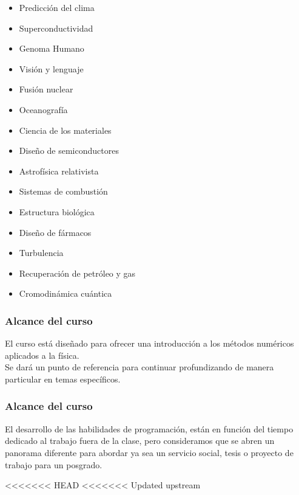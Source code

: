 \begin{frame}
\fontsize{14}{14}\selectfont
\begin{multicols}{2}
\begin{itemize}[<+->]
	\item Predicción del clima
	\item Superconductividad
	\item Genoma Humano
	\item Visión y lenguaje
	\item Fusión nuclear
	\item Oceanografía
	\item Ciencia de los materiales
	\item Diseño de semiconductores
	\item Astrofísica relativista
	\item Sistemas de combustión
	\item Estructura biológica
	\item Diseño de fármacos
	\item Turbulencia
	\item Recuperación de petróleo y gas
	\item Cromodinámica cuántica
\end{itemize}
\end{multicols}
\end{frame}
\begin{frame}
\frametitle{Alcance del curso}
El curso está diseñado para ofrecer una introducción a los métodos numéricos aplicados a la física.
\\
\medskip
Se dará un punto de referencia para continuar profundizando de manera particular en temas específicos. 
\end{frame}
\begin{frame}
\frametitle{Alcance del curso}
El desarrollo de las habilidades de programación, están en función del tiempo dedicado al trabajo fuera de la clase, pero consideramos que se abren un panorama diferente para abordar ya sea un servicio social, tesis o proyecto de trabajo para un posgrado.
\end{frame}
<<<<<<< HEAD
<<<<<<< Updated upstream
